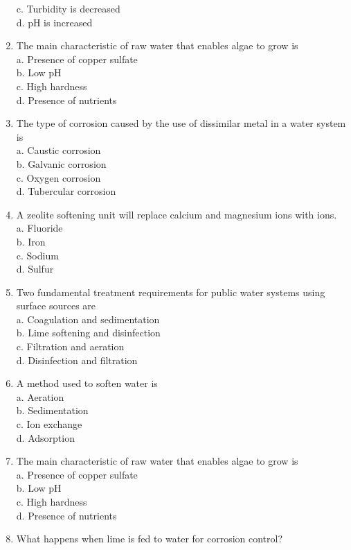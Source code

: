\begin{enumerate}
c. Turbidity is decreased\\
d. $\mathrm{pH}$ is increased\\
\item The main characteristic of raw water that enables algae to grow is\\
a. Presence of copper sulfate\\
b. Low $\mathrm{pH}$\\
c. High hardness\\
d. Presence of nutrients\\
\item The type of corrosion caused by the use of dissimilar metal in a water system is\\
a. Caustic corrosion\\
b. Galvanic corrosion\\
c. Oxygen corrosion\\
d. Tubercular corrosion\\
\item A zeolite softening unit will replace calcium and magnesium ions with ions.\\
a. Fluoride\\
b. Iron\\
c. Sodium\\
d. Sulfur\\
\item Two fundamental treatment requirements for public water systems using surface sources are\\
a. Coagulation and sedimentation\\
b. Lime softening and disinfection\\
c. Filtration and aeration\\
d. Disinfection and filtration\\
\item A method used to soften water is\\
a. Aeration\\
b. Sedimentation\\
c. Ion exchange\\
d. Adsorption\\
\item The main characteristic of raw water that enables algae to grow is\\
a. Presence of copper sulfate\\
b. Low $\mathrm{pH}$\\
c. High hardness\\
d. Presence of nutrients\\
\item What happens when lime is fed to water for corrosion control?\\

\end{enumerate}
